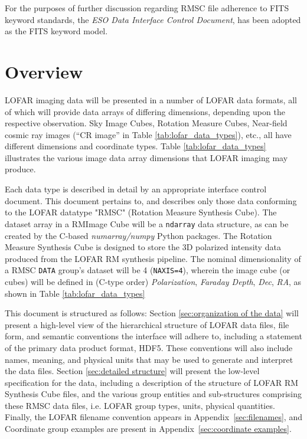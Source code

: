\documentclass[a4paper,10pt,bibtotoc]{scrartcl}
\begin{document}
For the purposes of further discussion regarding RMSC file adherence to FITS keyword standards, the \textit{ESO Data Interface Control Document}, has been adopted as the FITS keyword model.




\section{Overview}
\label{sec:overview}

LOFAR imaging data will be presented in a number of LOFAR data formats, all of which will provide data arrays of differing dimensions, depending upon the respective observation.  Sky Image Cubes, Rotation Measure Cubes, Near-field cosmic ray images (``CR image'' in Table \ref{tab:lofar_data_types}), etc., all have different dimensions and coordinate types.  Table \ref{tab:lofar_data_types} illustrates the various image data array dimensions  that LOFAR imaging may produce.



Each data type is described in detail by an appropriate interface control document.  This document pertains to, and describes only those data conforming to the LOFAR datatype "RMSC" (Rotation Measure Synthesis Cube).  The dataset array in a RMImage Cube will be a \verb|ndarray| data structure, as can be created by the C-based  \textit{numarray/numpy} Python packages. The Rotation Measure Synthesis Cube is designed to store the 3D polarized intensity data produced from the LOFAR RM synthesis pipeline.  The nominal dimensionality of a RMSC \texttt{DATA} group's dataset will be 4 (\texttt{NAXIS=4}), wherein the image cube (or cubes) will be defined in (C-type order) \textit{Polarization}, \textit{Faraday Depth}, \textit{Dec}, \textit{RA}, as shown in Table \ref{tab:lofar_data_types}

This document is structured as follows: Section \ref{sec:organization of the data} will present a high-level view of the hierarchical structure of LOFAR data files, file form, and semantic conventions the interface will adhere to, including a statement of the primary data product format, HDF5. These conventions will also include names, meaning, and physical units that may be used to generate and interpret the data files.  Section \ref{sec:detailed structure} will present the low-level specification for the data, including a description of the structure of LOFAR RM Synthesis Cube files, and the various group entities and sub-structures comprising these RMSC data files, i.e. LOFAR group types, units, physical quantities. Finally, the LOFAR filename convention appears in Appendix~\ref{sec:filenames}, and Coordinate group examples are present in Appendix~\ref{sec:coordinate examples}.
\end{document}
